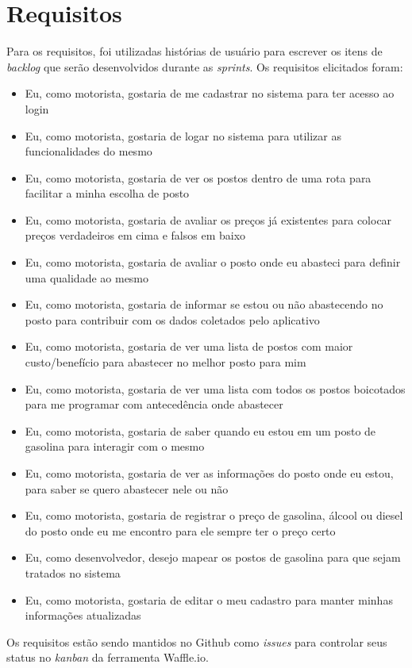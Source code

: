 \section{Requisitos}

Para os requisitos, foi utilizadas histórias de usuário para escrever os itens de \textit{backlog} que serão desenvolvidos durante as \textit{sprints}. Os requisitos elicitados foram:
\begin{itemize}
    \item Eu, como motorista, gostaria de me cadastrar no sistema para ter acesso ao login 
    \item Eu, como motorista, gostaria de logar no sistema para utilizar as funcionalidades do mesmo
    \item Eu, como motorista, gostaria de ver os postos dentro de uma rota para facilitar a minha escolha de posto
    \item Eu, como motorista, gostaria de avaliar os preços já existentes para colocar preços verdadeiros em cima e falsos em baixo
    \item Eu, como motorista, gostaria de avaliar o posto onde eu abasteci para definir uma qualidade ao mesmo
    \item Eu, como motorista, gostaria de informar se estou ou não abastecendo no posto para contribuir com os dados coletados pelo aplicativo
    \item Eu, como motorista, gostaria de ver uma lista de postos com maior custo/benefício para abastecer no melhor posto para mim
    \item Eu, como motorista, gostaria de ver uma lista com todos os postos boicotados para me programar com antecedência onde abastecer
    \item Eu, como motorista, gostaria de saber quando eu estou em um posto de gasolina para interagir com o mesmo
    \item Eu, como motorista, gostaria de ver as informações do posto onde eu estou, para saber se quero abastecer nele ou não
    \item Eu, como motorista, gostaria de registrar o preço de gasolina, álcool ou diesel do posto onde eu me encontro para ele sempre ter o preço certo
    \item Eu, como desenvolvedor, desejo mapear os postos de gasolina para que sejam tratados no sistema
    \item Eu, como motorista, gostaria de editar o meu cadastro para manter minhas informações atualizadas
\end{itemize}
Os requisitos estão sendo mantidos no Github como \textit{issues} para controlar seus status no \textit{kanban} da ferramenta Waffle.io.
